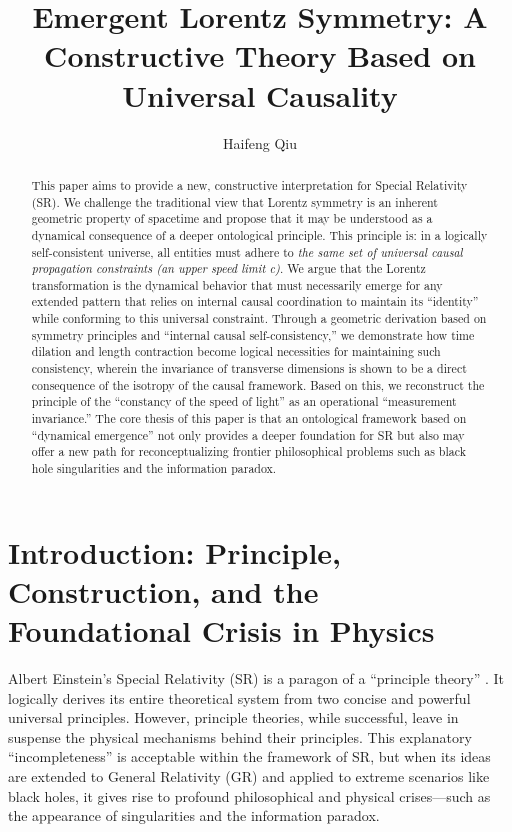 \documentclass[11pt, a4paper]{article}
\title{\textbf{Emergent Lorentz Symmetry: A Constructive Theory Based on Universal Causality}}
\author{Haifeng Qiu}
\begin{document}
\maketitle

\begin{abstract}
\noindent This paper aims to provide a new, constructive interpretation for Special Relativity (SR). We challenge the traditional view that Lorentz symmetry is an inherent geometric property of spacetime and propose that it may be understood as a dynamical consequence of a deeper ontological principle. This principle is: in a logically self-consistent universe, all entities must adhere to \textit{the same set of universal causal propagation constraints (an upper speed limit c)}. We argue that the Lorentz transformation is the dynamical behavior that must necessarily emerge for any extended pattern that relies on internal causal coordination to maintain its ``identity'' while conforming to this universal constraint. Through a geometric derivation based on symmetry principles and ``internal causal self-consistency,'' we demonstrate how time dilation and length contraction become logical necessities for maintaining such consistency, wherein the invariance of transverse dimensions is shown to be a direct consequence of the isotropy of the causal framework. Based on this, we reconstruct the principle of the ``constancy of the speed of light'' as an operational ``measurement invariance.'' The core thesis of this paper is that an ontological framework based on ``dynamical emergence'' not only provides a deeper foundation for SR but also may offer a new path for reconceptualizing frontier philosophical problems such as black hole singularities and the information paradox.
\end{abstract}

\section{Introduction: Principle, Construction, and the Foundational Crisis in Physics}

Albert Einstein's Special Relativity (SR) is a paragon of a ``principle theory'' \cite{Einstein1905, Brown2005}. It logically derives its entire theoretical system from two concise and powerful universal principles. However, principle theories, while successful, leave in suspense the physical mechanisms behind their principles. This explanatory ``incompleteness'' is acceptable within the framework of SR, but when its ideas are extended to General Relativity (GR) and applied to extreme scenarios like black holes, it gives rise to profound philosophical and physical crises—such as the appearance of singularities and the information paradox.
\end{document}
